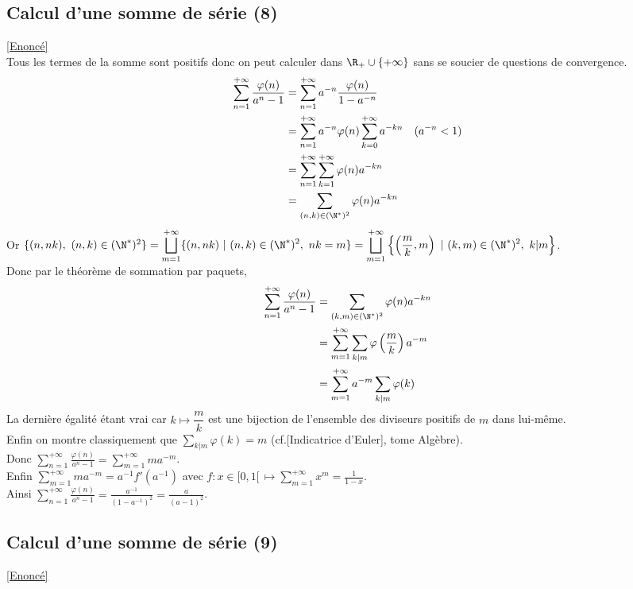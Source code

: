 \documentclass{book}
\begin{document}
	\subsection{Calcul d'une somme de série (8) }
	\label{Calcul d'une somme de série (8) corrigé}
	\textcolor{blue}{\hyperref[Calcul d'une somme de série (8)]{[Enoncé]}}\\
	Tous les termes de la somme sont positifs donc on peut calculer dans $\R_+\cup\{+\infty\}$ sans se soucier de questions de convergence.
	\begin{align*}
		\sum_{n=1}^{+\infty}\frac{\varphi(n)}{a^n-1}&=\sum_{n=1}^{+\infty}a^{-n}\frac{\varphi(n)}{1-a^{-n}}\\
		&=\sum_{n=1}^{+\infty}a^{-n}\varphi(n)\sum_{k=0}^{+\infty}a^{-kn}&(a^{-n}<1)\\
		&=\sum_{n=1}^{+\infty}\sum_{k=1}^{+\infty}\varphi(n)a^{-kn}\\
		&=\sum_{(n,k)\in (\N^*)^2}\varphi(n)a^{-kn}
	\end{align*}
	Or $\{(n,nk),\ (n,k)\in (\N^*)^2\}=\displaystyle\bigsqcup_{m=1}^{+\infty}\{(n,nk)\ |\ (n,k)\in (\N^*)^2,\ nk=m\}=\bigsqcup_{m=1}^{+\infty}\left\{\left(\frac{m}{k},m\right)\ |\ (k,m)\in (\N^*)^2,\ k|m\right\}$.\\
	Donc par le théorème de sommation par paquets,
	\begin{align*}
		\sum_{n=1}^{+\infty}\frac{\varphi(n)}{a^n-1}&=\sum_{(k,m)\in (\N^*)^2}\varphi(n)a^{-kn}\\
		&=\sum_{m=1}^{+\infty}\sum_{k|m}\varphi\left(\frac{m}{k}\right)a^{-m}\\
		&=\sum_{m=1}^{+\infty}a^{-m}\sum_{k|m}\varphi(k)
	\end{align*}
	La dernière égalité étant vrai car $k\mapsto \dfrac{m}{k}$ est une bijection de l'ensemble des diviseurs positifs de $m$ dans lui-même.\\
	Enfin on montre classiquement que $\displaystyle\sum_{k|m}\varphi(k)=m$ (cf.[Indicatrice d'Euler], tome Algèbre).\\
	Donc $\displaystyle\sum_{n=1}^{+\infty}\frac{\varphi(n)}{a^n-1}=\sum_{m=1}^{+\infty}ma^{-m}$.\\
	Enfin $\displaystyle\sum_{m=1}^{+\infty}ma^{-m}=a^{-1}f'(a^{-1})$ avec $f:x\in [0,1[\,\mapsto \displaystyle\sum_{m=1}^{+\infty}x^m=\frac{1}{1-x}$.\\
	Ainsi $\displaystyle\sum_{n=1}^{+\infty}\frac{\varphi(n)}{a^n-1}=\frac{a^{-1}}{(1-a^{-1})^2}=\frac{a}{(a-1)^2}$.
	
	\subsection{Calcul d'une somme de série (9)}
	\label{Calcul d'une somme de série (9) corrigé}
	\textcolor{blue}{\hyperref[Calcul d'une somme de série (9)]{[Enoncé]}}\\
	
\end{document}
